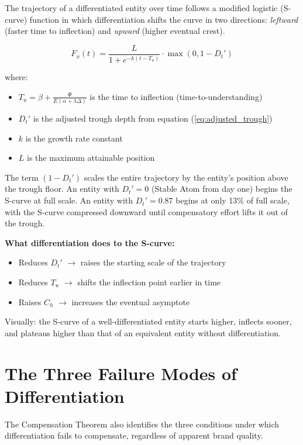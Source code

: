 \documentclass[12pt, openany]{book}
\theoremstyle{thmstyle}
\theoremstyle{defstyle}
\begin{document}
The trajectory of a differentiated entity over time follows a modified logistic (S-curve) function in which differentiation shifts the curve in two directions: \textit{leftward} (faster time to inflection) and \textit{upward} (higher eventual crest).

\begin{equation}
F_x(t) = \frac{L}{1 + e^{-k\left(t - T_u\right)}} \cdot \max\left(0, 1 - D_t'\right)
\label{eq:trajectory}
\end{equation}

where:
\begin{itemize}[leftmargin=1.5em]
  \item $T_u = \beta + \frac{\Phi}{E(\alpha + \lambda\Delta)}$ is the time to inflection (time-to-understanding)
  \item $D_t'$ is the adjusted trough depth from equation (\ref{eq:adjusted_trough})
  \item $k$ is the growth rate constant
  \item $L$ is the maximum attainable position
\end{itemize}

The term $(1 - D_t')$ scales the entire trajectory by the entity's position above the trough floor. An entity with $D_t' = 0$ (Stable Atom from day one) begins the S-curve at full scale. An entity with $D_t' = 0.87$ begins at only 13\% of full scale, with the S-curve compressed downward until compensatory effort lifts it out of the trough.

\textbf{What differentiation does to the S-curve:}
\begin{itemize}[leftmargin=1.5em]
  \item Reduces $D_t'$ $\rightarrow$ raises the starting scale of the trajectory
  \item Reduces $T_u$ $\rightarrow$ shifts the inflection point earlier in time
  \item Raises $C_h$ $\rightarrow$ increases the eventual asymptote
\end{itemize}

Visually: the S-curve of a well-differentiated entity starts higher, inflects sooner, and plateaus higher than that of an equivalent entity without differentiation.

\section{The Three Failure Modes of Differentiation}

The Compensation Theorem also identifies the three conditions under which differentiation fails to compensate, regardless of apparent brand quality.
\end{document}
